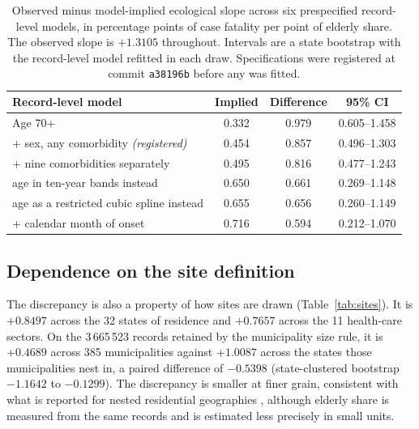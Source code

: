 \documentclass[11pt]{article}
\begin{document}
\begin{table}[t]
\centering
\caption{Observed minus model-implied ecological slope across six
prespecified record-level models, in percentage points of case fatality
per point of elderly share.  The observed slope is $+1.3105$ throughout.
Intervals are a state bootstrap with the record-level model refitted in
each draw.  Specifications were registered at commit \texttt{a38196b}
before any was fitted.}
\label{tab:ladder}
\begin{tabular}{lccc}
\toprule
Record-level model & Implied & Difference & 95\% CI \\
\midrule
Age 70+                                   & 0.332 & 0.979 & 0.605--1.458 \\
\;\;+ sex, any comorbidity \emph{(registered)} & 0.454 & 0.857 & 0.496--1.303 \\
\;\;+ nine comorbidities separately       & 0.495 & 0.816 & 0.477--1.243 \\
\;\;age in ten-year bands instead           & 0.650 & 0.661 & 0.269--1.148 \\
\;\;age as a restricted cubic spline instead & 0.655 & 0.656 & 0.260--1.149 \\
\;\;+ calendar month of onset             & 0.716 & 0.594 & 0.212--1.070 \\
\bottomrule
\end{tabular}
\end{table}

\subsection{Dependence on the site definition}

The discrepancy is also a property of how sites are drawn
(Table~\ref{tab:sites}).  It is $+0.8497$ across the 32 states of
residence and $+0.7657$ across the 11 health-care sectors.  On the
3\,665\,523 records retained by the municipality size rule, it is
$+0.4689$ across 385 municipalities against $+1.0087$ across the states
those municipalities nest in, a paired difference of $-0.5398$
(state-clustered bootstrap $-1.1642$ to $-0.1299$).  The discrepancy is smaller at finer grain, consistent with what is reported for nested residential
geographies \cite{best2001ecological,lancaster2006reducing}, although
elderly share is measured from the same records and is estimated less
precisely in small units.
\end{document}
